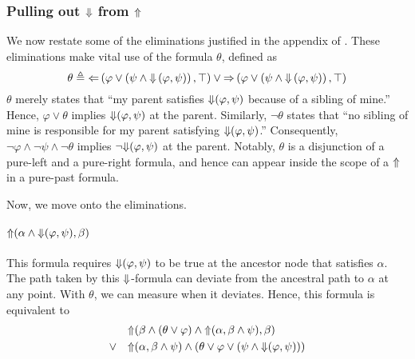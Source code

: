 \documentclass[a4paper,UKenglish,cleveref, autoref, thm-restate, numberwithinsect]{lipics-v2021}
\def\Larrow{\ensuremath\mathord{\Leftarrow}}
\def\Rarrow{\ensuremath\mathord{\Rightarrow}}
\def\Uarrow{\ensuremath\mathord{\Uparrow}}
\def\Darrow{\ensuremath\mathord{\Downarrow}}
\begin{document}
\subsubsection{Pulling out $\Darrow$ from $\Uarrow$}
\label{sec:eliminations-trees}

We now restate some of the eliminations justified in the appendix of \cite{xpathComplete}. These eliminations make vital use of the formula $\theta$, defined as
\begin{equation}
    \label{eq:theta-defn}
    \theta \triangleq \Larrow\left(\varphi \lor \left( \psi \land \Darrow\left( \varphi, \psi \right) \right), \top \right) \lor \Rarrow \left( \varphi \lor \left( \psi \land \Darrow \left( \varphi, \psi \right) \right), \top \right)
\end{equation}
$\theta$ merely states that ``my parent satisfies $\Darrow(\varphi, \psi)$ because of a sibling of mine.'' Hence, $\varphi \lor \theta$ implies $\Darrow(\varphi, \psi)$ at the parent. Similarly, $\lnot \theta$ states that ``no sibling of mine is responsible for my parent satisfying $\Darrow(\varphi, \psi)$.'' Consequently, $\lnot \varphi \land \lnot \psi \land \lnot \theta$ implies $\lnot \Darrow(\varphi, \psi)$ at the parent. Notably, $\theta$ is a disjunction of a pure-left and a pure-right formula, and hence can appear inside the scope of a $\Uarrow$ in a pure-past formula.

Now, we move onto the eliminations.

\paragraph*{$\Uarrow(\alpha \land \Darrow(\varphi, \psi), \beta)$}

This formula requires $\Darrow(\varphi, \psi)$ to be true at the ancestor node that satisfies $\alpha$. The path taken by this $\Darrow$-formula can deviate from the ancestral path to $\alpha$ at any point. With $\theta$, we can measure when it deviates. Hence, this formula is equivalent to
\begin{equation*}
    \begin{aligned}
        &\Uarrow(\beta \land (\theta \lor \varphi) \land \Uarrow(\alpha, \beta \land \psi), \beta) \\
        \lor \quad &\Uarrow(\alpha, \beta \land \psi) \land \left( \theta \lor \varphi \lor \left( \psi \land \Darrow(\varphi, \psi) \right) \right) \\
    \end{aligned}
\end{equation*}
\end{document}
